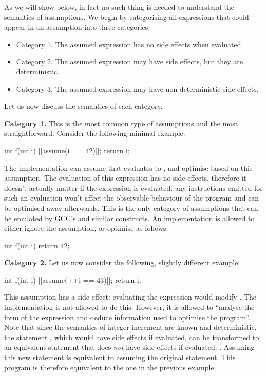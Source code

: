 As we will show below, in fact no such thing is needed to understand the semantics of assumptions. We begin by categorising all expressions that could appear in an assumption into three categories:
\begin{itemize}
\item Category 1. The assumed expression has no side effects when evaluated.
\item Category 2. The assumed expression may have side effects, but they are deterministic.
\item Category 3. The assumed expression may have non-deterministic side effects.
\end{itemize}
Let us now discuss the semantics of each category.

\textbf{Category 1.} This is the most common type of assumptions and the most straightforward. Consider the following minimal example:

\begin{codeblock}
int f(int i) {
  [[assume(i == 42)]];
  return i;
}
\end{codeblock}

The implementation can assume that  evaluates to , and optimise based on this assumption. The evaluation of this expression has no side effects, therefore it doesn't actually matter if the expression is evaluated: any instructions emitted for such an evaluation won't affect the observable behaviour of the program and can be optimised away afterwards. This is the only category of assumptions that can be emulated by GCC's  and similar constructs. An implementation is allowed to either ignore the assumption, or optimise  as follows:

\begin{codeblock}
int f(int i) {
  return 42;
}
\end{codeblock}

\textbf{Category 2.} Let us now consider the following, slightly different example:

\begin{codeblock}
int f(int i) {
  [[assume(++i == 43)]];
  return i;
}
\end{codeblock}

This assumption has a side effect: evaluating the expression would modify . The implementation is not allowed to do this. However, it is allowed to ``analyse the form of the expression and deduce information used to optimise the program''. Note that since the semantics of integer increment are known and deterministic, the statement , which would have side effects if evaluated, can be transformed to an equivalent statement that does \emph{not} have side effects if evaluated: . Assuming this new statement is equivalent to assuming the original statement. This program is therefore equivalent to the one in the previous example.

